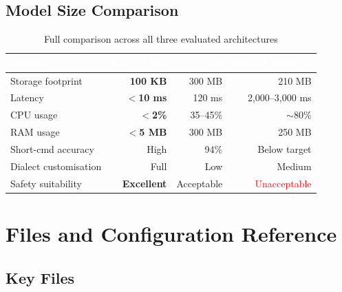 \documentclass[12pt, a4paper]{report}
\newcommand{\thead}[1]{%
  \cellcolor{tableheader}\textcolor{white}{\textbf{#1}}}
\newcommand{\trow}[1]{\rowcolor{rowalt}#1}
\begin{document}
\section{Model Size Comparison}

\begin{table}[h!]
\centering
\caption{Full comparison across all three evaluated architectures}
\label{tab:fullcomp}
\begin{tabular}{lrrr}
\toprule
\thead{Metric} & \thead{Local KWS} & \thead{Vosk} & \thead{Hybrid Whisper} \\
\midrule
\trow{Storage footprint} & \textbf{100 KB}  & 300 MB  & 210 MB \\
Latency                  & \textbf{$<$10 ms}& 120 ms  & 2,000--3,000 ms \\
\trow{CPU usage}         & \textbf{$<$2\%}  & 35--45\%& $\sim$80\% \\
RAM usage                & \textbf{$<$5 MB} & 300 MB  & 250 MB \\
\trow{Short-cmd accuracy}& High             & 94\%    & Below target \\
Dialect customisation    & Full             & Low     & Medium \\
\trow{Safety suitability}& \textbf{Excellent}& Acceptable & \textcolor{red}{Unacceptable} \\
\bottomrule
\end{tabular}
\end{table}

\chapter{Files and Configuration Reference}

\section{Key Files}
\end{document}

